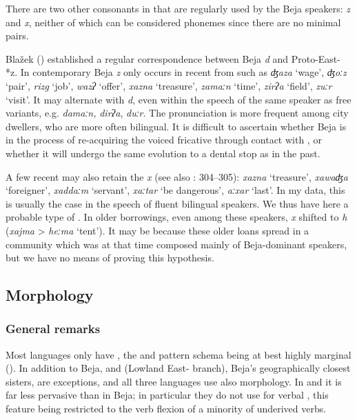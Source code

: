 \documentclass[output=paper]{langsci/langscibook}
\begin{document}
There are two other consonants in   that are regularly used by the Beja speakers: \textit{z} and \textit{x}, neither of which can be considered phonemes since there are no minimal pairs.

Blažek (\citeyear[130]{Blažek2007}) established a regular correspondence between Beja \textit{d} and Proto-East- *z. In contemporary Beja \textit{z} only occurs in recent  from   such as \textit{ʤaza} ‘wage’, \textit{ʤoːz} ‘pair’, \textit{rizg} ‘job’, \textit{wazʔ} ‘offer’, \textit{xazna} ‘treasure’, \textit{zamaːn} ‘time’, \textit{zirʔa} ‘field’, \textit{zuːr} ‘visit’. It may alternate with \textit{d}, even within the speech of the same speaker as free variants, e.g. \textit{damaːn,} \textit{dirʔa}, \textit{duːr}. The  pronunciation is more frequent among city dwellers, who are more often bilingual. It is difficult to ascertain whether Beja is in the process of re-acquiring the voiced fricative through contact with  , or whether it will undergo the same evolution to a dental stop as in the past.

A few recent   may also retain the  \textit{x} (see also \citealt{ManfrediSimeone-SenelleTosco2015}: 304--305): \textit{xazna} ‘treasure’, \textit{xawaʤa} ‘foreigner’, \textit{xaddaːm} ‘servant’, \textit{xaːtar} ‘be dangerous’, \textit{aːxar} ‘last’. In my data, this is usually the case in the speech of fluent bilingual speakers. We thus have here a probable  type of . In older borrowings, even among these speakers,  \textit{x} shifted to \textit{h} (\textit{xajma} > \textit{heːma} ‘tent’). It may be because these older loans spread in a community which was at that time composed mainly of Beja-dominant speakers, but we have no means of proving this hypothesis.


 
 \subsection{Morphology} \label{morphologyv}
 \subsubsection{General remarks}

Most  languages only have , the  and pattern schema being at best highly marginal (\citealt[256]{Cohen1988}). In addition to Beja,  and  (Lowland East- branch), Beja’s geographically closest sisters, are exceptions, and all three languages use also  morphology. In  and  it is far less pervasive than in Beja; in particular they do not use  for verbal , this feature being restricted to the verb flexion of a minority of underived verbs.
\end{document}
